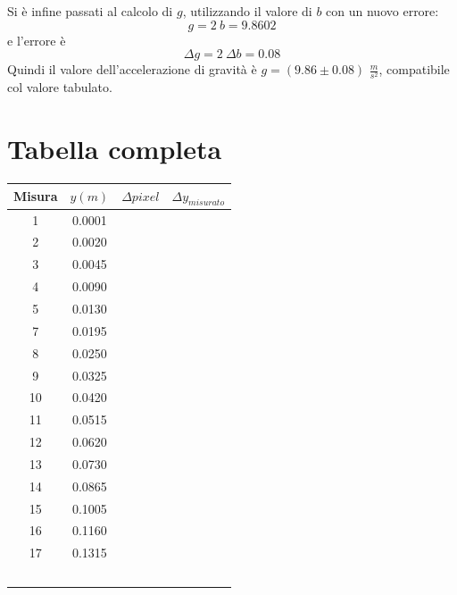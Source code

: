 \documentclass[12pt, a4paper]{article}
\begin{document}
Si è infine passati al calcolo di $g$, utilizzando il valore di $b$ con un nuovo errore:
\begin{equation*}
    g=2 \ b=9.8602
\end{equation*}
e l'errore è
\begin{equation*}
    \Delta g=2\ \Delta b=0.08
\end{equation*}
Quindi il valore dell'accelerazione di gravità è $g=(9.86\pm0.08)$ $\frac{m}{s^2}$, compatibile col valore tabulato.



\newpage

\section{Tabella completa}
\begin{table}[h!]
    \centering
    {\renewcommand\arraystretch{1.0} 
    \begin{tabular}{|c|c|c|c|}
    \hline
         \footnotesize Misura & $y$$(m)$ &$\Delta pixel$& $\Delta y_{misurato}$ \\
    \hline
         \footnotesize 1 &\footnotesize 0.0001& & \\
         \footnotesize 2 & \footnotesize0.0020& & \\
         \footnotesize 3 & \footnotesize0.0045& & \\
         \footnotesize 4 & \footnotesize0.0090& & \\
         \footnotesize 5 & \footnotesize0.0130& & \\
         \footnotesize 7 &\footnotesize0.0195 & & \\
         \footnotesize 8 &\footnotesize0.0250 & & \\
         \footnotesize 9 & \footnotesize0.0325& & \\
         \footnotesize 10 &\footnotesize0.0420 & & \\
         \footnotesize 11 & \footnotesize0.0515& & \\
         \footnotesize 12 & \footnotesize0.0620& & \\ 
         \footnotesize 13 &\footnotesize 0.0730& & \\
         \footnotesize 14 & \footnotesize0.0865& & \\
         \footnotesize 15 & \footnotesize0.1005& & \\
         \footnotesize 16 & \footnotesize0.1160& & \\
         \footnotesize 17 & \footnotesize0.1315& & \\
$$
\end{tabular}}
\end{table}
\end{document}

